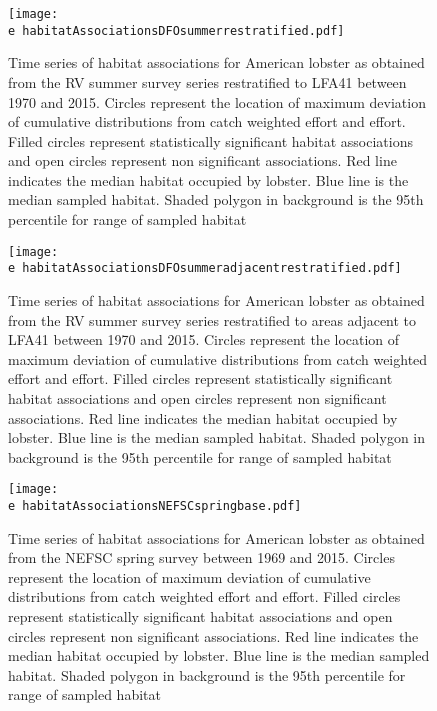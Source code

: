 \documentclass[11pt]{article}
\newcommand{\e}{/backup/bio_data/bio.lobster/figures/} %
\begin{document}
\begin{figure}

    \texttt{[image: \\e habitatAssociationsDFOsummerrestratified.pdf]}
    \caption{Time series of habitat associations for American lobster as obtained from the RV summer survey series restratified to LFA41 between 1970 and 2015. Circles represent the location of maximum deviation of cumulative distributions from catch weighted effort and effort. Filled circles represent statistically significant habitat associations and open circles represent non significant associations. Red line indicates
the median habitat occupied by lobster. Blue line is the median sampled habitat. Shaded polygon in background is the 95th percentile for range of sampled habitat}

\end{figure}



\begin{figure}

    \texttt{[image: \\e habitatAssociationsDFOsummeradjacentrestratified.pdf]}
    \caption{Time series of habitat associations for American lobster as obtained from the RV summer survey series restratified to areas adjacent to LFA41 between 1970 and 2015. Circles represent the location of maximum deviation of cumulative distributions from catch weighted effort and effort. Filled circles represent statistically significant habitat associations and open circles represent non significant associations. Red line indicates
the median habitat occupied by lobster. Blue line is the median sampled habitat. Shaded polygon in background is the 95th percentile for range of sampled habitat}

\end{figure}



\begin{figure}

    \texttt{[image: \\e habitatAssociationsNEFSCspringbase.pdf]}
    \caption{Time series of habitat associations for American lobster as obtained from the NEFSC spring survey between 1969 and 2015. Circles represent the location of maximum deviation of cumulative distributions from catch weighted effort and effort. Filled circles represent statistically significant habitat associations and open circles represent non significant associations. Red line indicates
the median habitat occupied by lobster. Blue line is the median sampled habitat. Shaded polygon in background is the 95th percentile for range of sampled habitat}

\end{figure}
\end{document}
